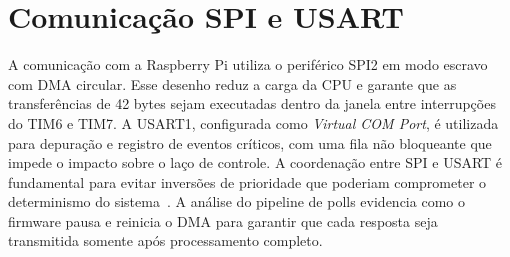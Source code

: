 \section{Comunicação SPI e USART}

A comunicação com a Raspberry Pi utiliza o periférico SPI2 em modo
escravo com DMA circular. Esse desenho reduz a carga da CPU e garante que
as transferências de 42 bytes sejam executadas dentro da janela entre
interrupções do TIM6 e TIM7. A USART1, configurada como \emph{Virtual
COM Port}, é utilizada para depuração e registro de eventos críticos,
com uma fila não bloqueante que impede o impacto sobre o laço de
controle. A coordenação entre SPI e USART é fundamental para evitar
inversões de prioridade que poderiam comprometer o determinismo do
sistema~\cite{um2153}. A análise do pipeline de polls evidencia como o
firmware pausa e reinicia o DMA para garantir que cada resposta seja
transmitida somente após processamento completo.